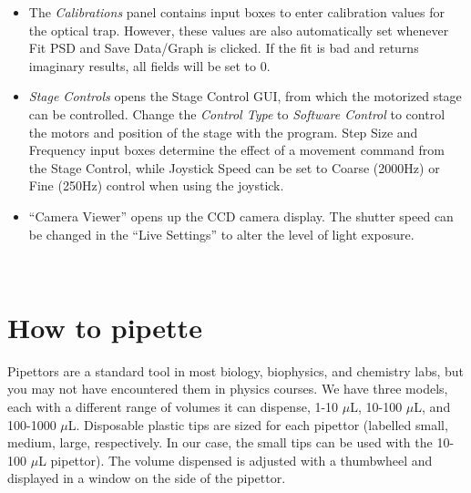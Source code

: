 \documentclass{../lab}
\begin{document}
\begin{itemize}
    \item The \emph{Calibrations} panel contains input boxes to enter calibration values for the optical trap. However, these values are also automatically set whenever Fit PSD and Save Data/Graph is clicked. If the fit is bad and returns imaginary results, all fields will be set to 0.

\end{itemize}

\begin{itemize}
    \item \emph{Stage Controls} opens the Stage Control GUI, from which the motorized stage can be controlled. Change the \emph{Control Type} to \emph{Software Control} to control the motors and position of the stage with the program. Step Size and Frequency input boxes determine the effect of a movement command from the Stage Control, while Joystick Speed can be set to Coarse (2000Hz) or Fine (250Hz) control when using the joystick.

\end{itemize}

\begin{itemize}
    \item ``Camera Viewer'' opens up the CCD camera display. The shutter speed can be changed in the ``Live Settings'' to alter the level of light exposure.

\end{itemize}

​

\section{How to pipette}

Pipettors are a standard tool in most biology, biophysics, and chemistry labs, but you may not have encountered them in physics courses. We have three models, each with a different range of volumes it can dispense, 1-10 $ \mu $L, 10-100 $ \mu $L, and 100-1000 $ \mu $L. Disposable plastic tips are sized for each pipettor (labelled small, medium, large, respectively. In our case, the small tips can be used with the 10-100 $ \mu $L pipettor). The volume dispensed is adjusted with a thumbwheel and displayed in a window on the side of the pipettor.
\end{document}
